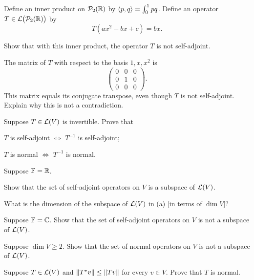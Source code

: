 \begin{exc}
\begin{exercise}
Define an inner product on $\mathcal{P}_2(\mathbb{R})$ by $\langle p, q \rangle=\int_0^1pq$. Define an
operator $T\in\mathcal{L}\bigl(\mathcal{P}_2(\mathbb{R})\bigr)$ by
\[ T(ax^2+bx+c) = bx. \]
\begin{parts}
\item Show that with this inner product, the operator $T$ is not self-adjoint.
\item The matrix of $T$ with respect to the basis $1,x,x^2$ is
  \[ \begin{pmatrix} 0 & 0 & 0\\ 0 & 1 & 0\\ 0 & 0 & 0 \end{pmatrix}. \]
  This matrix equals its conjugate transpose, even though $T$ is not
  self-adjoint. Explain why this is not a contradiction.
\end{parts}
\end{exercise}

\begin{exercise}
Suppose $T\in\mathcal{L}(V)$ is invertible. Prove that
\begin{parts}
\item $T$ is self-adjoint $\iff$ $T^{-1}$ is self-adjoint;
\item $T$ is normal $\iff$ $T^{-1}$ is normal.
\end{parts}
\end{exercise}

\begin{exercise}
Suppose $\mathbb{F}=\mathbb{R}$.
\begin{parts}
\item Show that the set of self-adjoint operators on $V$ is a subspace of
  $\mathcal{L}(V)$.
\item What is the dimension of the subspace of $\mathcal{L}(V)$ in (a) [in terms of
  $\dim V$]?
\end{parts}
\end{exercise}

\begin{exercise}
Suppose $\mathbb{F}=\mathbb{C}$. Show that the set of self-adjoint operators on $V$ is not a
subspace of $\mathcal{L}(V)$.
\end{exercise}

\begin{exercise}
Suppose $\dim V\ge2$. Show that the set of normal operators on $V$ is not a
subspace of $\mathcal{L}(V)$.
\end{exercise}

\begin{exercise}
Suppose $T\in\mathcal{L}(V)$ and $\lVert T^*v \rVert\le\lVert Tv \rVert$ for every $v\in V$. Prove
that $T$ is normal.
\end{exercise}


\end{exc}
